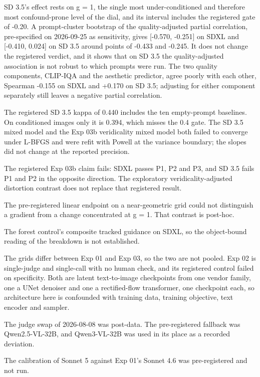 \documentclass[11pt]{article}
\begin{document}
SD 3.5's effect rests on g = 1, the single most under-conditioned and therefore
most confound-prone level of the dial, and its interval includes the registered
gate of -0.20. A prompt-cluster bootstrap of the quality-adjusted partial
correlation, pre-specified on 2026-09-25 as sensitivity, gives {[}-0.570,
-0.251{]} on SDXL and {[}-0.410, 0.024{]} on SD 3.5 around points of -0.433 and
-0.245. It does not change the registered verdict, and it shows that on SD 3.5
the quality-adjusted association is not robust to which prompts were run. The
two quality components, CLIP-IQA and the aesthetic predictor, agree poorly with
each other, Spearman -0.155 on SDXL and +0.170 on SD 3.5; adjusting for either
component separately still leaves a negative partial correlation.

The registered SD 3.5 kappa of 0.440 includes the ten empty-prompt baselines. On
conditioned images only it is 0.394, which misses the 0.4 gate. The SD 3.5 mixed
model and the Exp 03b veridicality mixed model both failed to converge under
L-BFGS and were refit with Powell at the variance boundary; the slopes did not
change at the reported precision.

The registered Exp 03b claim fails: SDXL passes P1, P2 and P3, and SD 3.5 fails
P1 and P2 in the opposite direction. The exploratory veridicality-adjusted
distortion contrast does not replace that registered result.

The pre-registered linear endpoint on a near-geometric grid could not
distinguish a gradient from a change concentrated at g = 1. That contrast is
post-hoc.

The forest control's composite tracked guidance on SDXL, so the object-bound
reading of the breakdown is not established.

The grids differ between Exp 01 and Exp 03, so the two are not pooled. Exp 02 is
single-judge and single-call with no human check, and its registered control
failed on specificity. Both are latent text-to-image checkpoints from one vendor
family, one a UNet denoiser and one a rectified-flow transformer, one checkpoint
each, so architecture here is confounded with training data, training objective,
text encoder and sampler.

The judge swap of 2026-08-08 was post-data. The pre-registered fallback was
Qwen2.5-VL-32B, and Qwen3-VL-32B was used in its place as a recorded deviation.

The calibration of Sonnet 5 against Exp 01's Sonnet 4.6 was pre-registered and
not run.
\end{document}
